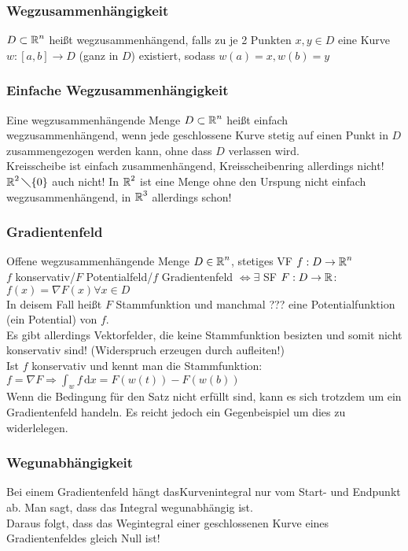 \documentclass[german]{latex4ei/latex4ei_sheet}
\begin{document}
\subsubsection{Wegzusammenh\"angigkeit}
$D \subset \operatorname{\mathbb R}^n$ hei\ss{}t wegzusammenh\"angend, falls zu je 2 Punkten $x,y \in D$ eine Kurve $w:[a,b]\to D$ (ganz in $D$) existiert, sodass $w(a)=x,w(b)=y$

\subsubsection{Einfache Wegzusammenh\"angigkeit}
Eine wegzusammenh\"angende Menge $D \subset \operatorname{\mathbb R}^n$ hei\ss{}t einfach wegzusammenh\"angend, wenn jede geschlossene Kurve stetig auf einen Punkt in $D$ zusammengezogen werden kann, ohne dass $D$ verlassen wird.\\
Kreisscheibe ist einfach zusammenh\"angend, Kreisscheibenring allerdings nicht! $\operatorname{\mathbb R}^2 \diagdown \{0\}$ auch nicht! In $\operatorname{\mathbb R}^2$ ist eine Menge ohne den Urspung nicht einfach wegzusammenh\"angend, in $\operatorname{\mathbb R}^3$ allerdings schon!\\

\subsubsection{Gradientenfeld}
Offene wegzusammenh\"angende Menge $D \in \operatorname{\mathbb R}^n$, stetiges VF $f: D\to\operatorname{\mathbb R}^n$\\
$f$ konservativ/$F$ Potentialfeld/$f$ Gradientenfeld $\Leftrightarrow \exists $ SF $F:D\to\operatorname{\mathbb R}$: $f(x)=\nabla F(x) \forall x \in D$\\
In deisem Fall hei\ss{}t $F$ Stammfunktion und manchmal ??? eine Potentialfunktion (ein Potential) von $f$.\\
Es gibt allerdings Vektorfelder, die keine Stammfunktion besizten und somit nicht konservativ sind! (Widerspruch erzeugen durch aufleiten!)\\
Ist  $f$ konservativ und kennt man die Stammfunktion: $ f=\nabla F \Rightarrow \int_w \! f \, \mathrm{d} x=F(w(t))-F(w(b))$\\ 
Wenn die Bedingung f\"ur den Satz nicht erf\"ullt sind, kann es sich trotzdem um ein Gradientenfeld handeln. Es reicht jedoch ein Gegenbeispiel um dies zu widerlelegen.

\subsubsection{Wegunabh\"angigkeit}
Bei einem Gradientenfeld h\"angt dasKurvenintegral nur vom Start- und Endpunkt ab. Man sagt, dass das Integral wegunabh\"angig ist.\\
Daraus folgt, dass das Wegintegral einer geschlossenen Kurve eines Gradientenfeldes gleich Null ist!
\end{document}
